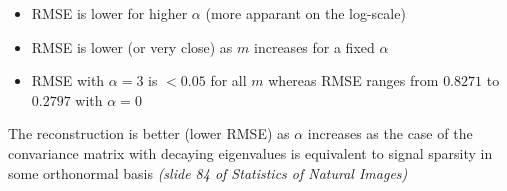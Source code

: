 \documentclass[a4paper]{article}
\begin{document}
\begin{itemize}
\item RMSE is lower for higher $\alpha$ (more apparant on the log-scale)
\item RMSE is lower (or very close) as $m$ increases for a fixed $\alpha$
\item RMSE with $\alpha=3$ is $<0.05$ for all $m$ whereas RMSE ranges from $0.8271$ to $0.2797$ with $\alpha=0$
\end{itemize}
The reconstruction is better (lower RMSE) as $\alpha$ increases as the case of the convariance matrix with decaying eigenvalues is equivalent to signal sparsity in some orthonormal basis \emph{(slide 84 of Statistics of Natural Images)}
\end{document}
